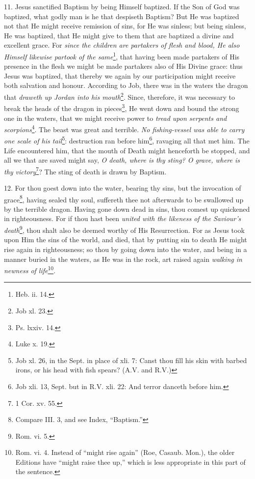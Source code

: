 11. Jesus sanctified Baptism by being Himself baptized. If the Son of God was baptized, what godly man is he that despiseth Baptism? But He was baptized not that He might receive remission of sins, for He was sinless; but being sinless, He was baptized, that He might give to them that are baptized a divine and excellent grace. For \emph{since the children are partakers of flesh and blood, He also Himself likewise partook of the same}\footnote{Heb. ii. 14.}, that having been made partakers of His presence in the flesh we might be made partakers also of His Divine grace: thus Jesus was baptized, that thereby we again by our participation might receive both salvation and honour. According to Job, there was in the waters the dragon that \emph{draweth up Jordan into his mouth}\footnote{Job xl. 23.}. Since, therefore, it was necessary to break the heads of the dragon in pieces\footnote{Ps. lxxiv. 14.}, He went down and bound the strong one in the waters, that we might receive power to \emph{tread upon serpents and scorpions}\footnote{Luke x. 19.}. The beast was great and terrible. \emph{No fishing-vessel was able to carry one scale of his tail}\footnote{Job xl. 26, in the Sept. in place of xli. 7: Canst thou fill his skin with barbed irons, or his head with fish spears? (\textsc{A.V.} and \textsc{R.V.})}: destruction ran before him\footnote{Job xli. 13, Sept. but in R.V. xli. 22: And terror danceth before him.}, ravaging all that met him. The Life encountered him, that the mouth of Death might henceforth be stopped, and all we that are saved might say, \emph{O death, where is thy sting? O grave, where is thy victory}\footnote{1 Cor. xv. 55.}? The sting of death is drawn by Baptism.

12. For thou goest down into the water, bearing thy sins, but the invocation of grace\footnote{Compare III. 3, and see Index, “Baptism.”}, having sealed thy soul, suffereth thee not afterwards to be swallowed up by the terrible dragon. Having gone down dead in sins, thou comest up quickened in righteousness. For if thou hast been \emph{united with the likeness of the Saviour’s death}\footnote{Rom. vi. 5.}, thou shalt also be deemed worthy of His Resurrection. For as Jesus took upon Him the sins of the world, and died, that by putting sin to death He might rise again in righteousness; so thou by going down into the water, and being in a manner buried in the waters, as He was in the rock, art raised again \emph{walking in newness of life}\footnote{Rom. vi. 4. Instead of “might rise again” (Roe, Casaub. Mon.), the older Editions have “might raise thee up,” which is less appropriate in this part of the sentence.}.

